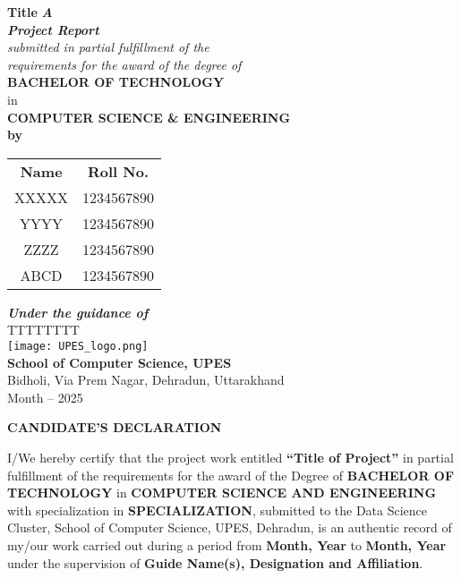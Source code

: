 \documentclass[a4paper,12pt]{report}
\begin{document}
\begin{titlepage}
    \centering
    \vspace*{1cm}
    \Huge
    \textbf{Title}
    \vfill
    \LARGE
    \textbf{\textit{A\\
    Project Report}}\\
    \textit{submitted in partial fulfillment of the\\
    requirements for the award of the degree of}\\
    \vfill
    \textbf{BACHELOR OF TECHNOLOGY}\\
    in\\
    \textbf{COMPUTER SCIENCE \& ENGINEERING}\\
    \vfill
    \textbf{by}\\
    \large
 \begin{tabular}{c c}
        \textbf{Name} & \textbf{Roll No.} \\ 
        XXXXX  & 1234567890 \\
        YYYY   & 1234567890 \\
        ZZZZ   & 1234567890 \\
        ABCD   & 1234567890 \\
\end{tabular}
    
    \vfill
    \textbf{\textit{Under the guidance of}}\\
    TTTTTTTT\\
    \vfill
    \texttt{[image: UPES\_logo.png]}\\
    \vfill
    \textbf{School of Computer Science, UPES}\\
     Bidholi, Via Prem Nagar, Dehradun, Uttarakhand\\
    Month -- 2025
\end{titlepage}


\begin{center}
    \Large \textbf{CANDIDATE’S DECLARATION}
\end{center}

\vspace{1cm}

I/We hereby certify that the project work entitled \textbf{``Title of Project''} in partial fulfillment of the requirements for the award of the Degree of \textbf{BACHELOR OF TECHNOLOGY} in \textbf{COMPUTER SCIENCE AND ENGINEERING} with specialization in \textbf{SPECIALIZATION}, submitted to the Data Science Cluster, School of Computer Science, UPES, Dehradun, is an authentic record of my/our work carried out during a period from \textbf{Month, Year} to \textbf{Month, Year} under the supervision of \textbf{Guide Name(s), Designation and Affiliation}.
\end{document}

